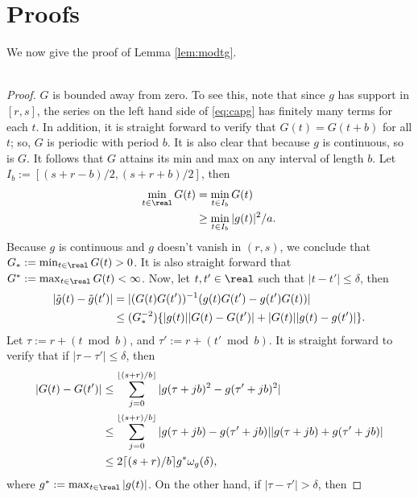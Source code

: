   \section{Proofs}\label{ap:proof}
  We now give the proof of Lemma \eqref{lem:modtg}. \\ \\
  \begin{proof}
   $G$ is bounded away from zero. To see this, note that since $g$ has support in  $[r,s]$, the series on the left hand side of \eqref{eq:capg} has finitely many terms for each $t$.  In addition, it is straight forward to verify that $G(t) = G(t+b)$ for all $t$; so,  $G$ is periodic with period $b$. It is also clear that because $g$ is continuous, so is $G$. It follows that $G$ attains its min and max on any interval of length $b$. Let $I_b := [(s+r -b)/2, (s+r +b)/2]$, then
  \begin{align}
    \min_{t\in\real} G(t) &=  \min_{t \in I_b} G(t) \notag\\
    & \ge \min_{t \in I_b}\vert g(t)\vert^2/a.\notag
    \label{}
  \end{align}  
  Because $g$ is continuous and $g$ doesn't vanish in $(r,s)$, we conclude that $G_*:=\min_{t \in \real}G(t) > 0$. It is also straight forward that $G^* := \max_{t \in \real}G(t) < \infty$. Now, let $t, t' \in \real$ such that $\vert t - t' \vert \le \delta$, then 
  \begin{align}
    \vert \tilde{g}(t) - \tilde{g}(t')\vert & = \vert (G(t)G(t'))^{-1}(g(t)G(t') - g(t')G(t))\vert  \notag\\
    & \le (G_*^{-2})\{\vert g(t)\vert \vert G(t) - G(t') \vert + \vert G(t)\vert \vert g(t) - g(t')\vert\}. 
    \label{eq:difftg}
  \end{align}
Let $\tau := r +  (t \bmod {b})$, and $\tau':=r + (t' \bmod{b})$. It is straight forward to verify that if  $\vert \tau - \tau' \vert \le \delta$, then
\begin{align}
  \vert G(t) - G(t') \vert & \le  \sum_{j = 0}^{\lfloor (s + r)/b \rfloor} \vert g(\tau + j b)^2 - g(\tau' + j b)^2\vert\notag\\
  & \le \sum_{j = 0}^{\lfloor (s + r)/b \rfloor} \vert g(\tau + j b) - g(\tau' + j b) \vert \vert g(\tau + j b) + g(\tau' + j b)\vert\notag\\
  & \le 2 \lceil (s + r)/b\rceil g^*\omega_g(\delta),
  \label{}
\end{align}
where $g^* := \max_{t \in \real} \vert g(t)\vert $. On the other hand, if $\vert \tau - \tau'\vert > \delta$, then 

\end{proof}
